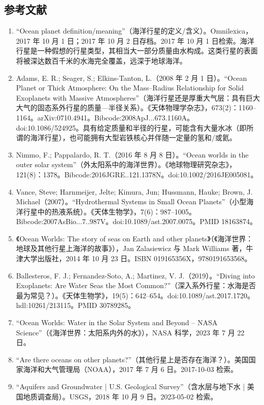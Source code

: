 \subsection{参考文献}
\begin{enumerate}
\item “Ocean planet definition/meaning”（海洋行星的定义/含义）。Omnilexica，2017 年 10 月 1 日；2017 年 10 月 2 日存档。2017 年 10 月 1 日检索。海洋行星是一种假想的行星类型，其相当大一部分质量由水构成。这类行星的表面将被深达数百千米的水海完全覆盖，远深于地球海洋。
\item Adams, E. R.; Seager, S.; Elkins-Tanton, L.（2008 年 2 月 1 日）。“Ocean Planet or Thick Atmosphere: On the Mass–Radius Relationship for Solid Exoplanets with Massive Atmospheres”（海洋行星还是厚重大气层：具有巨大大气的固态系外行星的质量—半径关系）。《天体物理学杂志》，673(2)：1160–1164。arXiv:0710.4941。Bibcode:2008ApJ...673.1160A。doi:10.1086/524925。具有给定质量和半径的行星，可能含有大量水冰（即所谓的海洋行星），也可能拥有大型岩铁核心并伴随一定量的氢和/或氦。
\item Nimmo, F.; Pappalardo, R. T.（2016 年 8 月 8 日）。“Ocean worlds in the outer solar system”（外太阳系中的海洋世界）。《地球物理研究杂志》，121(8)：1378。Bibcode:2016JGRE..121.1378N。doi:10.1002/2016JE005081。
\item Vance, Steve; Harnmeijer, Jelte; Kimura, Jun; Hussmann, Hauke; Brown, J. Michael（2007）。“Hydrothermal Systems in Small Ocean Planets”（小型海洋行星中的热液系统）。《天体生物学》，7(6)：987–1005。Bibcode:2007AsBio...7..987V。doi:10.1089/ast.2007.0075。PMID 18163874。
\item 《Ocean Worlds: The story of seas on Earth and other planets》（《海洋世界：地球及其他行星上海洋的故事》），Jan Zalasiewicz 与 Mark Williams 著，牛津大学出版社，2014 年 10 月 23 日。ISBN 019165356X，9780191653568。
\item Ballesteros, F. J.; Fernandez-Soto, A.; Martinez, V. J.（2019）。“Diving into Exoplanets: Are Water Seas the Most Common?”（深入系外行星：水海是否最为常见？）。《天体生物学》，19(5)：642–654。doi:10.1089/ast.2017.1720。hdl:10261/213115。PMID 30789285。
\item “Ocean Worlds: Water in the Solar System and Beyond – NASA Science”（《海洋世界：太阳系内外的水》），NASA 科学，2023 年 7 月 22 日。
\item “Are there oceans on other planets?”（其他行星上是否存在海洋？）。美国国家海洋和大气管理局（NOAA），2017 年 7 月 6 日。2017-10-03 检索。
\item “Aquifers and Groundwater | U.S. Geological Survey”（含水层与地下水 | 美国地质调查局）。USGS，2018 年 10 月 9 日。2023-05-02 检索。

\end{enumerate}
